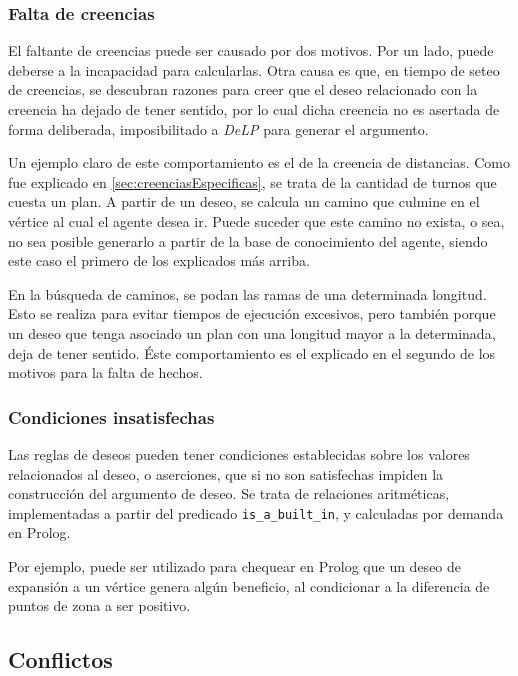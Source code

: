 \documentclass[oneside]{book}
\theoremstyle{definition}
\theoremstyle{example}
\begin{document}
\subsubsection{Falta de creencias}

El faltante de creencias puede ser causado por dos motivos. Por un lado, puede 
deberse a la incapacidad para calcularlas. Otra causa es que, en tiempo de seteo de creencias,
se descubran razones para creer que el deseo relacionado con la creencia ha dejado de tener 
sentido, por lo cual dicha creencia no es asertada de forma deliberada, imposibilitado a \textit{DeLP}
para generar el argumento.

Un ejemplo claro de este comportamiento es el de la creencia de distancias. Como fue explicado en 
\ref{sec:creenciasEspecificas}, se trata de la cantidad de turnos que cuesta un plan. A partir de un
deseo, se calcula un camino que culmine en el vértice al cual el agente desea ir. Puede suceder que 
este camino no exista, o sea, no sea posible generarlo a partir de la base de conocimiento del 
agente, siendo este caso el primero de los explicados más arriba. 

En la búsqueda de caminos, se podan las ramas de una determinada longitud. Esto se realiza para evitar
tiempos de ejecución excesivos, pero también porque un deseo que tenga asociado un plan con una 
longitud mayor a la determinada, deja de tener sentido. Éste comportamiento es el explicado en el 
segundo de los motivos para la falta de hechos.

\subsubsection{Condiciones insatisfechas}

Las reglas de deseos pueden tener condiciones establecidas sobre los valores relacionados al deseo,
o aserciones, que
si no son satisfechas impiden la construcción del argumento de deseo. Se trata de relaciones aritméticas,
implementadas a partir del predicado \texttt{is\_a\_built\_in}, y calculadas por demanda en Prolog.

Por ejemplo, puede ser utilizado para chequear en Prolog que un deseo de expansión a un vértice genera
algún beneficio, al condicionar a la diferencia de puntos de zona a ser positivo.

\subsection{Conflictos}
\end{document}

